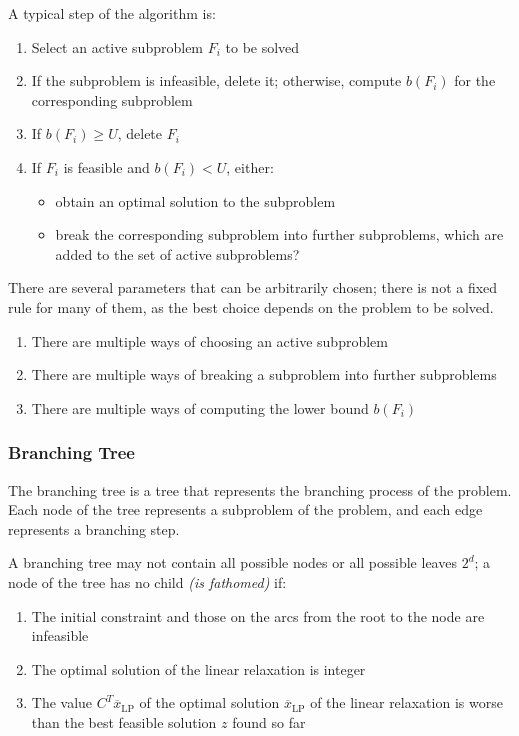 \documentclass[english]{article}
\begin{document}
A typical step of the algorithm is:

\begin{enumerate}
  \item Select an active subproblem \(F_i\) to be solved
  \item If the subproblem is infeasible, delete it; otherwise, compute \(b(F_i)\) for the corresponding subproblem
  \item If \(b(F_i) \geq U\), delete \(F_i\)
  \item If \(F_i\) is feasible and \(b(F_i) < U\), either:
        \begin{itemize}
          \item obtain an optimal solution to the subproblem
          \item break the corresponding subproblem into further subproblems, which are added to the set of active subproblems?
        \end{itemize}
\end{enumerate}

\bigskip
There are several parameters that can be arbitrarily chosen;
there is not a fixed rule for many of them, as the best choice depends on the problem to be solved.

\begin{enumerate}
  \item There are multiple ways of choosing an active subproblem
  \item There are multiple ways of breaking a subproblem into further subproblems
  \item There are multiple ways of computing the lower bound \(b(F_i)\)
\end{enumerate}

\subsubsection{Branching Tree}

The branching tree is a tree that represents the branching process of the \ILP problem.
Each node of the tree represents a subproblem of the \ILP problem, and each edge represents a branching step.

A branching tree may not contain all possible nodes or all possible leaves \(2^d\);
a node of the tree has no child \textit{(is fathomed)} if:

\begin{enumerate}
  \item The initial constraint and those on the arcs from the root to the node are infeasible
  \item The optimal solution of the linear relaxation is integer
  \item The value \(C^T \overline{x}_{\text{LP}}\) of the optimal solution \(\overline{x}_{\text{LP}}\) of the linear relaxation is worse than the best feasible solution \(z\) found so far
\end{enumerate}
\end{document}
